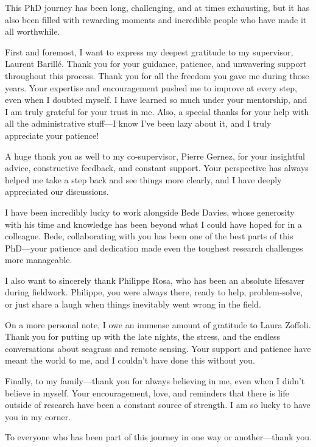 

This PhD journey has been long, challenging, and at times exhausting, but it has also been filled with rewarding moments and incredible people who have made it all worthwhile.

First and foremost, I want to express my deepest gratitude to my supervisor, Laurent Barillé. Thank you for your guidance, patience, and unwavering support throughout this process. Thank you for all the freedom you gave me during those years. Your expertise and encouragement pushed me to improve at every step, even when I doubted myself. I have learned so much under your mentorship, and I am truly grateful for your trust in me. Also, a special thanks for your help with all the administrative stuff—I know I’ve been lazy about it, and I truly appreciate your patience!

A huge thank you as well to my co-supervisor, Pierre Gernez, for your insightful advice, constructive feedback, and constant support. Your perspective has always helped me take a step back and see things more clearly, and I have deeply appreciated our discussions. 

I have been incredibly lucky to work alongside Bede Davies, whose generosity with his time and knowledge has been beyond what I could have hoped for in a colleague. Bede, collaborating with you has been one of the best parts of this PhD—your patience and dedication made even the toughest research challenges more manageable.

I also want to sincerely thank Philippe Rosa, who has been an absolute lifesaver during fieldwork. Philippe, you were always there, ready to help, problem-solve, or just share a laugh when things inevitably went wrong in the field.

On a more personal note, I owe an immense amount of gratitude to Laura Zoffoli. Thank you for putting up with the late nights, the stress, and the endless conversations about seagrass and remote sensing. Your support and patience have meant the world to me, and I couldn’t have done this without you.

Finally, to my family—thank you for always believing in me, even when I didn’t believe in myself. Your encouragement, love, and reminders that there is life outside of research have been a constant source of strength. I am so lucky to have you in my corner.

To everyone who has been part of this journey in one way or another—thank you.

